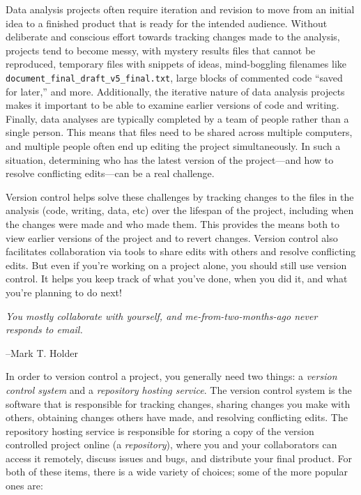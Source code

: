 \documentclass[
]{krantz}
\renewenvironment{quote}{\begin{VF}}{\end{VF}}
\begin{document}
Data analysis projects often require iteration and revision to move from an initial idea
to a finished product that is ready for the intended audience. Without
deliberate and conscious effort towards tracking changes made to the analysis,
projects tend to become messy, with mystery results files that cannot be reproduced,
temporary files with snippets of ideas, mind-boggling filenames like \texttt{document\_final\_draft\_v5\_final.txt},
large blocks of commented code ``saved for later,'' and more. Additionally,
the iterative nature of data analysis projects makes it important to be able to examine
earlier versions of code and writing. Finally, data analyses are typically completed by a team of
people rather than a single person. This means that files need to be
shared across multiple computers, and multiple people often end up editing the project
simultaneously. In such a situation, determining who has the latest version of the project---and
how to resolve conflicting edits---can be a real challenge.

Version control helps solve these challenges by tracking changes to the files in the
analysis (code, writing, data, etc) over the lifespan of the project, including when the changes were made and who made
them. This provides the means both to view earlier versions of the project and to revert changes.
Version control also facilitates collaboration via tools to share edits with others and resolve conflicting edits.
But even if you're working on a project alone, you should still use version control.
It helps you keep track of what you've done, when you did it, and what you're planning to do next!

\begin{quote}
\emph{You mostly collaborate with yourself, and me-from-two-months-ago never responds to email.}

--Mark T. Holder
\end{quote}

In order to version control a project, you generally need two things: a \emph{version control system}
and a \emph{repository hosting service}. The version control system is the software that is responsible
for tracking changes, sharing changes you make with others, obtaining changes others have made, and resolving conflicting edits.
The repository hosting service is responsible for storing a copy of the version controlled project online (a \emph{repository}),
where you and your collaborators can access it remotely, discuss issues and bugs, and distribute your final product.
For both of these items, there is a wide variety of choices; some of the more popular ones are:
\end{document}
